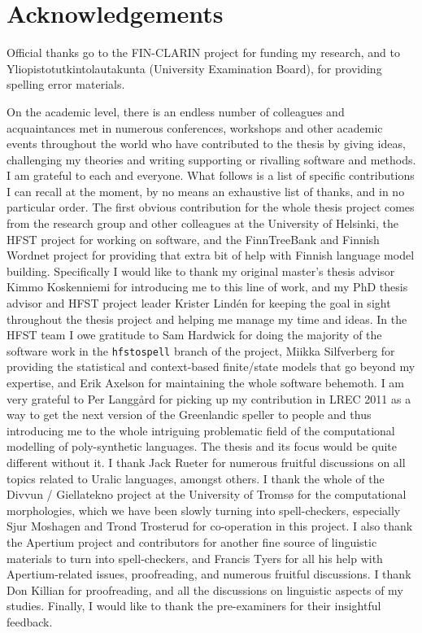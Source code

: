 \documentclass[officiallayout,final]{unihelcompling}
\begin{document}
\section*{Acknowledgements}
\label{sec:acknowledgements}

Official thanks go to the FIN-CLARIN project for funding my research, and to
Yliopistotutkintolautakunta (University Examination Board), for providing
spelling error materials.

On the academic level, there is an endless number of colleagues and
acquaintances met in numerous conferences, workshops and other academic events
throughout the world who have contributed to the thesis by giving ideas,
challenging my theories and writing supporting or rivalling software and
methods. I am grateful to each and everyone. What follows is a list of
specific contributions I can recall at the moment, by no means an exhaustive
list of thanks, and in no particular order.  The first obvious contribution for
the whole thesis project comes from the research group and other colleagues at
the University of Helsinki, the HFST project for working on software, and the
FinnTreeBank and Finnish Wordnet project for providing that extra bit of help
with Finnish language model building. Specifically I would like to thank my
original master's thesis advisor Kimmo Koskenniemi for introducing me to this
line of work, and my PhD thesis advisor and HFST project leader Krister Lindén
for keeping the goal in sight throughout the thesis project and helping me
manage my time and ideas.  In the HFST team I owe gratitude to Sam Hardwick for
doing the majority of the software work in the \texttt{hfstospell} branch of
the project, Miikka Silfverberg for providing the statistical and context-based
finite\-/state models that go beyond my expertise, and Erik Axelson for
maintaining the whole software behemoth.  I am very grateful to Per Langgård
for picking up my contribution in LREC 2011 as a way to get the next version of
the Greenlandic speller to people and thus introducing me to the whole
intriguing problematic field of the computational modelling of poly-synthetic
languages. The thesis and its focus would be quite different without it.  I
thank Jack Rueter for numerous fruitful discussions on all topics related to
Uralic languages, amongst others.  I thank the whole of the Divvun /
Giellatekno project at the University of Tromsø for the computational
morphologies, which we have been slowly turning into spell-checkers, especially
Sjur Moshagen and Trond Trosterud for co-operation in this project. I also
thank the Apertium project and contributors for another fine source of
linguistic materials to turn into spell-checkers, and Francis Tyers for all his
help with Apertium-related issues, proofreading, and numerous fruitful
discussions. I thank Don Killian for proofreading, and all the discussions on
linguistic aspects of my studies. Finally, I would like to thank the
pre-examiners for their insightful feedback.
\end{document}
